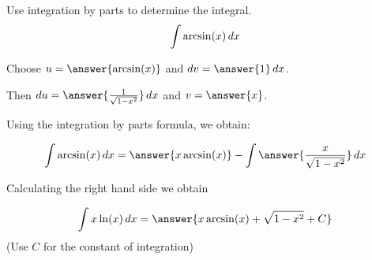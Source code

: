 \documentclass{ximera}
\author{Jason Miller}
\begin{document}
\begin{exercise}
Use integration by parts to determine the integral.
\[
\int \arcsin(x) \mathop{}\!d x 
\]


Choose $u=\answer{ \arcsin(x) }$ and $\d v=\answer{1 }\d x$. 

Then $\d u= \answer{ \frac{1}{\sqrt{1-x^{2}}} } \d x$ and $v= \answer{x}$.

Using the integration by parts formula, we obtain:

\[
\int \arcsin(x) \d x= \answer{x\arcsin(x)} - \int \answer{ \frac{x}{\sqrt{1-x^{2}}} } \d x
\]

Calculating the right hand side we obtain

\[
\int x \ln(x) \d x= \answer{x\arcsin(x)+\sqrt{1-x^2}+C}
\]
(Use $C$ for the constant of integration)

\end{exercise}
\end{document}
